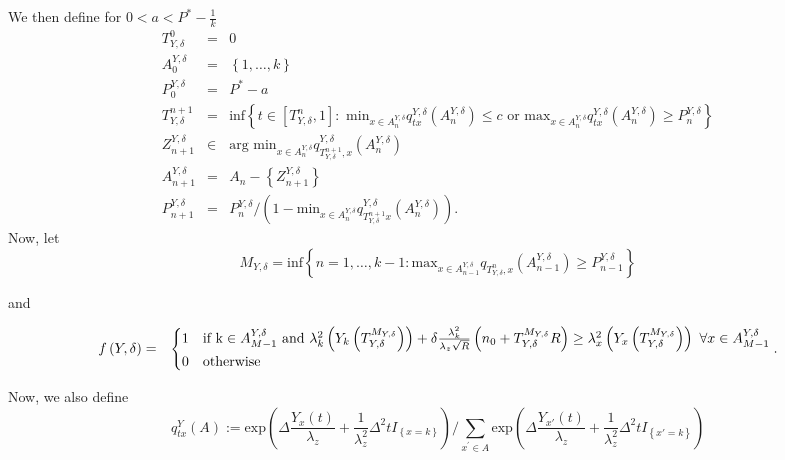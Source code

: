 \documentclass[11pt,english]{article}
\begin{document}
We then define for $0<a<P^{*}-\frac{1}{k}$
\[
\]
\begin{eqnarray*}
T_{Y,\delta}^{0} & = & 0\\
A_{0}^{Y,\delta} & = & \left\{ 1,\ldots,k\right\} \\
P_{0}^{Y,\delta} & = & P^{*}-a\\
T_{Y,\delta}^{n+1} & = & \mbox{inf}\left\{ t\in\left[T_{Y,\delta}^{n},1\right]:\mbox{ min}_{x\in A_{n}^{Y,\delta}}q_{tx}^{Y,\delta}\left(A_{n}^{Y,\delta}\right)\leq c\mbox{ or }\mbox{max}_{x\in A_{n}^{Y,\delta}}q_{tx}^{Y,\delta}\left(A_{n}^{Y,\delta}\right)\geq P_{n}^{Y,\delta}\right\} \\
Z_{n+1}^{Y,\delta} & \in & \mbox{arg min}_{x\in A_{n}^{Y,\delta}}q_{T_{Y,\delta}^{n+1},x}^{Y,\delta}\left(A_{n}^{Y,\delta}\right)\\
A_{n+1}^{Y,\delta} & = & A_{n}-\left\{ Z_{n+1}^{Y,\delta}\right\} \\
P_{n+1}^{Y,\delta} & = & P_{n}^{Y,\delta}/\left(1-\mbox{min}_{x\in A_{n}^{Y,\delta}}q_{T_{Y,\delta}^{n+1}x}^{Y,\delta}\left(A_{n}^{Y,\delta}\right)\right).
\end{eqnarray*}
Now, let
\[
M_{Y,\delta}=\mbox{inf}\left\{ n=1,\ldots,k-1:\mbox{max}_{x\in A_{n-1}^{Y,\delta}}q_{T_{Y,\delta}^{n},x}\left(A_{n-1}^{Y,\delta}\right)\geq P_{n-1}^{Y,\delta}\right\} 
\]


and

\begin{eqnarray*}
f\left(Y,\delta\right) & = & \begin{cases}
1 & \mbox{if }\mbox{k}\in A_{M-1}^{Y,\delta}\mbox{ and }\lambda_{k}^{2}\left(Y_{k}\left(T_{Y,\delta}^{M_{Y,\delta}}\right)\right)+\delta\frac{\lambda_{k}^{2}}{\lambda_{z}\sqrt{R}}\left(n_{0}+T_{Y,\delta}^{M_{Y,\delta}}R\right)\geq\lambda_{x}^{2}\left(Y_{x}\left(T_{Y,\delta}^{M_{Y,\delta}}\right)\right)\mbox{ }\mbox{\ensuremath{\forall}}x\in A_{M-1}^{Y,\delta}\\
0 & \mbox{otherwise}
\end{cases}.
\end{eqnarray*}


Now, we also define$ $
\[
q_{tx}^{Y}\left(A\right):=\mbox{exp}\left(\Delta\frac{Y_{x}\left(t\right)}{\lambda_{z}}+\frac{1}{\lambda_{z}^{2}}\Delta^{2}tI_{\left\{ x=k\right\} }\right)/\sum_{x^{'}\in A}\mbox{exp}\left(\Delta\frac{Y_{x'}\left(t\right)}{\lambda_{z}}+\frac{1}{\lambda_{z}^{2}}\Delta^{2}tI_{\left\{ x'=k\right\} }\right)
\]
\end{document}
